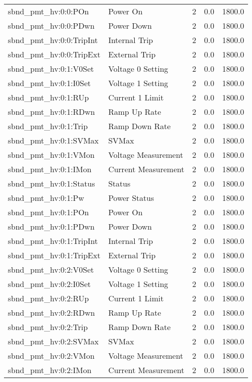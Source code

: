 \begin{center}
\begin{longtable}{l | l l l l }
sbnd\_pmt\_hv:0:0:POn & Power On & 2 & 0.0 & 1800.0\\ 
sbnd\_pmt\_hv:0:0:PDwn & Power Down & 2 & 0.0 & 1800.0\\ 
sbnd\_pmt\_hv:0:0:TripInt & Internal Trip & 2 & 0.0 & 1800.0\\ 
sbnd\_pmt\_hv:0:0:TripExt & External Trip & 2 & 0.0 & 1800.0\\ 
sbnd\_pmt\_hv:0:1:V0Set & Voltage 0 Setting & 2 & 0.0 & 1800.0\\ 
sbnd\_pmt\_hv:0:1:I0Set & Voltage 1 Setting & 2 & 0.0 & 1800.0\\ 
sbnd\_pmt\_hv:0:1:RUp & Current 1 Limit & 2 & 0.0 & 1800.0\\ 
sbnd\_pmt\_hv:0:1:RDwn & Ramp Up Rate & 2 & 0.0 & 1800.0\\ 
sbnd\_pmt\_hv:0:1:Trip & Ramp Down Rate & 2 & 0.0 & 1800.0\\ 
sbnd\_pmt\_hv:0:1:SVMax & SVMax & 2 & 0.0 & 1800.0\\ 
sbnd\_pmt\_hv:0:1:VMon & Voltage Measurement & 2 & 0.0 & 1800.0\\ 
sbnd\_pmt\_hv:0:1:IMon & Current Measurement & 2 & 0.0 & 1800.0\\ 
sbnd\_pmt\_hv:0:1:Status & Status & 2 & 0.0 & 1800.0\\ 
sbnd\_pmt\_hv:0:1:Pw & Power Status & 2 & 0.0 & 1800.0\\ 
sbnd\_pmt\_hv:0:1:POn & Power On & 2 & 0.0 & 1800.0\\ 
sbnd\_pmt\_hv:0:1:PDwn & Power Down & 2 & 0.0 & 1800.0\\ 
sbnd\_pmt\_hv:0:1:TripInt & Internal Trip & 2 & 0.0 & 1800.0\\ 
sbnd\_pmt\_hv:0:1:TripExt & External Trip & 2 & 0.0 & 1800.0\\ 
sbnd\_pmt\_hv:0:2:V0Set & Voltage 0 Setting & 2 & 0.0 & 1800.0\\ 
sbnd\_pmt\_hv:0:2:I0Set & Voltage 1 Setting & 2 & 0.0 & 1800.0\\ 
sbnd\_pmt\_hv:0:2:RUp & Current 1 Limit & 2 & 0.0 & 1800.0\\ 
sbnd\_pmt\_hv:0:2:RDwn & Ramp Up Rate & 2 & 0.0 & 1800.0\\ 
sbnd\_pmt\_hv:0:2:Trip & Ramp Down Rate & 2 & 0.0 & 1800.0\\ 
sbnd\_pmt\_hv:0:2:SVMax & SVMax & 2 & 0.0 & 1800.0\\ 
sbnd\_pmt\_hv:0:2:VMon & Voltage Measurement & 2 & 0.0 & 1800.0\\ 
sbnd\_pmt\_hv:0:2:IMon & Current Measurement & 2 & 0.0 & 1800.0\\ 

\end{longtable}
\end{center}
